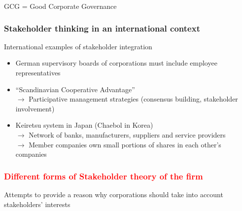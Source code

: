 \documentclass{article}
\DeclareRobustCommand{\k}[1]{\textcolor{red}{#1}}
\begin{document}
\begin{center}
\end{center}

GCG = Good Corporate Governance

\subsubsection{Stakeholder thinking in an international context}
International examples of stakeholder integration
\begin{itemize}
    \item German supervisory boards of corporations must include employee representatives
    \item ``Scandinavian Cooperative Advantage''\\
    $\to$ Participative management strategies (consensus building, stakeholder involvement)
    \item Keiretsu system in Japan (Chaebol in Korea)\\
    $\to$ Network of banks, manufacturers, suppliers and service providers\\
    $\to$ Member companies own small portions of shares in each other's companies
\end{itemize}

\subsubsection{\k{Different forms of Stakeholder theory of the firm}}
Attempts to provide a reason why corporations should take into account
stakeholders' interests
\end{document}
